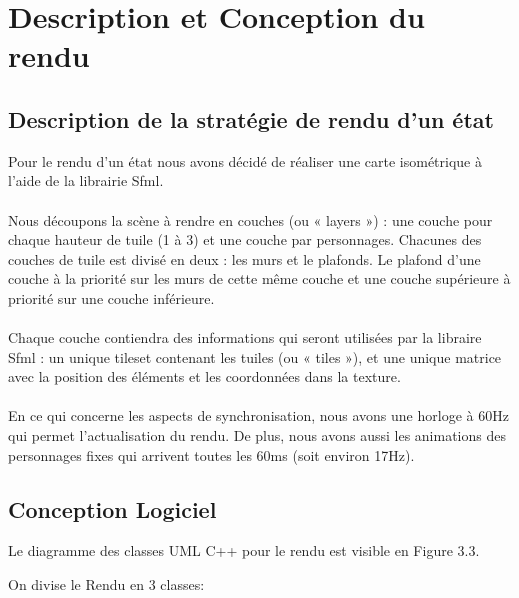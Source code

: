 \chapter{Description et Conception du rendu}


\section{Description de la stratégie de rendu d’un état}

Pour le rendu d'un état nous avons décidé de réaliser une carte isométrique à l'aide de la librairie Sfml.
\\
\\Nous découpons la scène à rendre en couches (ou « layers ») : une couche 
pour chaque hauteur de tuile (1 à 3) et une couche par personnages.
Chacunes des couches de tuile est divisé en deux : les murs et le
plafonds. Le plafond d'une couche à la priorité sur les murs de
cette même couche et une couche supérieure à priorité sur une
couche inférieure.
\\
\\Chaque couche contiendra des informations qui seront utilisées
par la libraire Sfml : un unique tileset contenant les tuiles 
(ou « tiles »), et une unique matrice avec 
la position des éléments et les coordonnées dans la texture.
\\
\\En ce qui concerne les aspects de synchronisation, nous avons 
une horloge à 60Hz qui permet l'actualisation du rendu. 
De plus, nous avons aussi les animations des personnages 
fixes qui arrivent toutes les 60ms (soit environ 17Hz).

\section{Conception Logiciel}

Le diagramme des classes UML C++ pour le rendu est visible en Figure 3.3.

On divise le Rendu en 3 classes:

